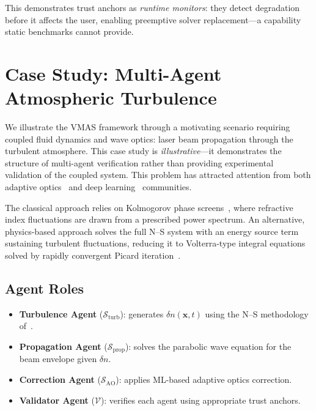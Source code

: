 \documentclass[conference]{IEEEtran}
\begin{document}
This demonstrates trust anchors as \emph{runtime monitors}: they detect degradation before it affects the user, enabling preemptive solver replacement---a capability static benchmarks cannot provide.


\section{Case Study: Multi-Agent Atmospheric Turbulence}
\label{sec:casestudy}

We illustrate the VMAS framework through a motivating scenario requiring coupled fluid dynamics and wave optics: laser beam propagation through the turbulent atmosphere. This case study is \emph{illustrative}---it demonstrates the structure of multi-agent verification rather than providing experimental validation of the coupled system. This problem has attracted attention from both adaptive optics~\cite{AndrewsPhillips2005} and deep learning~\cite{DLTurbReview2024} communities.

The classical approach relies on Kolmogorov phase screens~\cite{Schmidt2010}, where refractive index fluctuations are drawn from a prescribed power spectrum. An alternative, physics-based approach solves the full N--S system with an energy source term sustaining turbulent fluctuations, reducing it to Volterra-type integral equations solved by rapidly convergent Picard iteration~\cite{Shugaev2009}.

\subsection{Agent Roles}

\begin{itemize}
  \item \textbf{Turbulence Agent} ($\mathcal{S}_{\mathrm{turb}}$): generates $\delta n(\mathbf{x},t)$ using the N--S methodology of~\cite{Shugaev2009}.
  \item \textbf{Propagation Agent} ($\mathcal{S}_{\mathrm{prop}}$): solves the parabolic wave equation for the beam envelope given $\delta n$.
  \item \textbf{Correction Agent} ($\mathcal{S}_{\mathrm{AO}}$): applies ML-based adaptive optics correction.
  \item \textbf{Validator Agent} ($\mathcal{V}$): verifies each agent using appropriate trust anchors.
\end{itemize}
\end{document}
